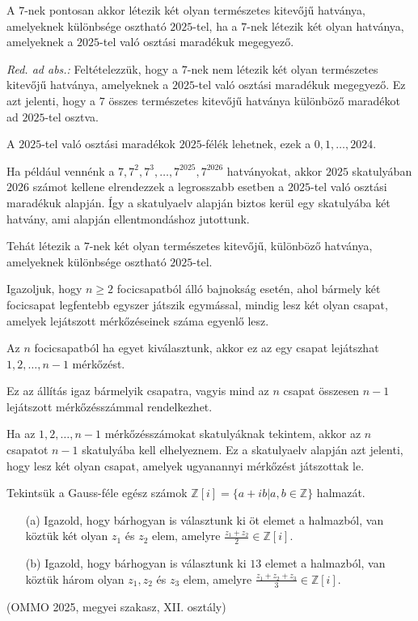 \begin{solution}
	A $7$-nek pontosan akkor létezik két olyan természetes kitevőjű hatványa,
	amelyeknek különbsége osztható $2025$-tel, ha a $7$-nek létezik
	két olyan hatványa, amelyeknek a $2025$-tel való osztási maradékuk
	megegyező.
	
	\textit{Red. ad abs.:} Feltételezzük, hogy a $7$-nek nem létezik
	két olyan természetes kitevőjű hatványa, amelyeknek a $2025$-tel
	való osztási maradékuk megegyező. Ez azt jelenti, hogy a $7$ összes
	természetes kitevőjű hatványa különböző maradékot ad $2025$-tel osztva.
	
	A $2025$-tel való osztási maradékok $2025$-félék lehetnek, ezek
	a $0,1,\ldots,2024$.
	
	Ha például vennénk a $7,7^{2},7^{3},\ldots,7^{2025},7^{2026}$ hatványokat,
	akkor $2025$ skatulyában $2026$ számot kellene elrendezzek a legrosszabb
	esetben a $2025$-tel való osztási maradékuk alapján. Így a skatulyaelv
	alapján biztos kerül egy skatulyába két hatvány, ami alapján ellentmondáshoz
	jutottunk.
	
	Tehát létezik a $7$-nek két olyan természetes kitevőjű, különböző
	hatványa, amelyeknek különbsége osztható $2025$-tel. 
\end{solution}
\begin{extraproblem}
	Igazoljuk, hogy $n\geq2$ focicsapatból álló bajnokság esetén, ahol
	bármely két focicsapat legfentebb egyszer játszik egymással, mindig
	lesz két olyan csapat, amelyek lejátszott mérkőzéseinek száma egyenlő
	lesz. 
\end{extraproblem}

\begin{solution}
	Az $n$ focicsapatból ha egyet kiválasztunk, akkor ez az egy csapat
	lejátszhat $1,2,\ldots,n-1$ mérkőzést.
	
	Ez az állítás igaz bármelyik csapatra, vagyis mind az $n$ csapat
	összesen $n-1$ lejátszott mérkőzésszámmal rendelkezhet.
	
	Ha az $1,2,\ldots,n-1$ mérkőzésszámokat skatulyáknak tekintem, akkor
	az $n$ csapatot $n-1$ skatulyába kell elhelyeznem. Ez a skatulyaelv
	alapján azt jelenti, hogy lesz két olyan csapat, amelyek ugyanannyi
	mérkőzést játszottak le. 
\end{solution}
\begin{extraproblem}
	Tekintsük a Gauss-féle egész számok $\mathbb{Z}[i]=\{a+ib|a,b\in\mathbb{Z}\}$
	halmazát. 
	\begin{enumerate}
		\item[(a)] Igazold, hogy bárhogyan is választunk ki öt elemet a halmazból, van
		köztük két olyan $z_{1}$ és $z_{2}$ elem, amelyre $\frac{z_{1}+z_{2}}{2}\in\mathbb{Z}[i]$.
		\item[(b)] Igazold, hogy bárhogyan is választunk ki $13$ elemet a halmazból,
		van köztük három olyan $z_{1},z_{2}$ és $z_{3}$ elem, amelyre $\frac{z_{1}+z_{2}+z_{3}}{3}\in\mathbb{Z}[i]$. 
	\end{enumerate}
	\begin{flushright}
		(OMMO 2025, megyei szakasz, XII. osztály) 
		\par\end{flushright}
\end{extraproblem}

